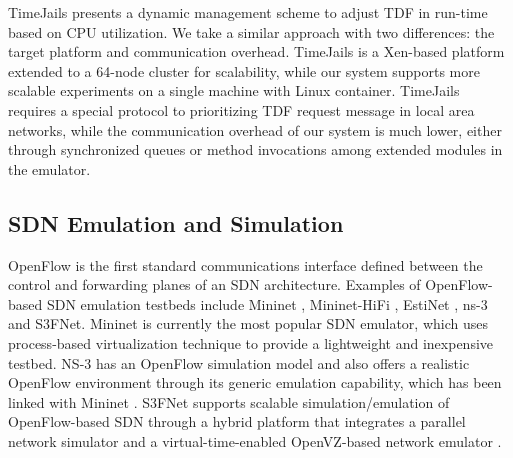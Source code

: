 TimeJails \cite{TimeJails} presents a dynamic management scheme \cite{NtwkEmultAdaptVirtTime} to adjust TDF in run-time based on CPU utilization. 
We take a similar approach with two differences: the target platform and communication overhead. TimeJails is a Xen-based platform extended to a 64-node cluster for scalability, while our system supports more scalable experiments on a single machine with Linux container.
TimeJails requires a special protocol to prioritizing TDF request message in local area networks, while the communication overhead of our system is much lower, either through synchronized queues or method invocations among extended modules in the emulator.

\subsection{SDN Emulation and Simulation}
OpenFlow \cite{Openflow} is the first standard communications interface defined between the control and forwarding planes of an SDN architecture. 
Examples of OpenFlow-based SDN emulation testbeds include Mininet \cite{LaptopSDN}, Mininet-HiFi \cite{ReproNetExprCBE}, EstiNet \cite{EstiNet}, ns-3 \cite{NS-3} and S3FNet\cite{jin2013parallel}.
Mininet is currently the most popular SDN emulator, which uses process-based virtualization technique to provide a lightweight and inexpensive testbed. 
NS-3 \cite{NS-3} has an OpenFlow simulation model and also offers a realistic OpenFlow environment through its generic emulation capability, which has been linked with Mininet \cite{MininetLinkNS3}. 
S3FNet\cite{jin2013parallel} supports scalable simulation/emulation of OpenFlow-based SDN through a hybrid platform that integrates a parallel network simulator and a virtual-time-enabled OpenVZ-based network emulator \cite{S3F_website}. 




